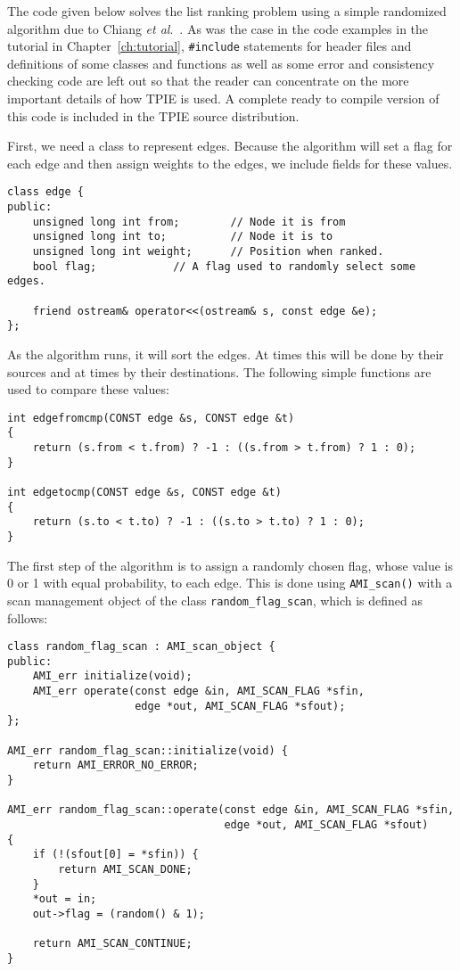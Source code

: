 The code given below solves the list ranking problem using a simple
randomized algorithm due to Chiang {\em et al}.~\cite{chiang:external}.
As was the case in the code examples in the tutorial in
Chapter~\ref{ch:tutorial}, \verb|#include| statements
for header files and definitions of some classes and functions as well
as some error and consistency checking code are left out so that the
reader can concentrate on the more important details of how TPIE is
used.  A complete ready to compile version of this code is included in
the TPIE source distribution.

First, we need a class to represent edges.  Because the algorithm will
set a flag for each edge and then assign weights to the edges, we
include fields for these values.

\begin{verbatim}
class edge {
public:
    unsigned long int from;        // Node it is from
    unsigned long int to;          // Node it is to
    unsigned long int weight;      // Position when ranked.
    bool flag;            // A flag used to randomly select some edges.

    friend ostream& operator<<(ostream& s, const edge &e);
};    
\end{verbatim}

As the algorithm runs, it will sort the edges.  At times this will be
done by their sources and at times by their destinations.  The
following simple functions are used to compare these values:

\begin{verbatim}
int edgefromcmp(CONST edge &s, CONST edge &t)
{
    return (s.from < t.from) ? -1 : ((s.from > t.from) ? 1 : 0);
}
  
int edgetocmp(CONST edge &s, CONST edge &t)
{
    return (s.to < t.to) ? -1 : ((s.to > t.to) ? 1 : 0);
}
\end{verbatim}

The first step of the algorithm is to assign a randomly chosen flag,
whose value is 0 or 1 with equal probability, to each edge.  This is
done using \verb|AMI_scan()| with a scan management object of the
class \verb|random_flag_scan|, which is defined as follows:

\begin{verbatim}
class random_flag_scan : AMI_scan_object {
public:
    AMI_err initialize(void);  
    AMI_err operate(const edge &in, AMI_SCAN_FLAG *sfin,
                    edge *out, AMI_SCAN_FLAG *sfout);
};

AMI_err random_flag_scan::initialize(void) {
    return AMI_ERROR_NO_ERROR;
}

AMI_err random_flag_scan::operate(const edge &in, AMI_SCAN_FLAG *sfin,
                                  edge *out, AMI_SCAN_FLAG *sfout)
{ 
    if (!(sfout[0] = *sfin)) {
        return AMI_SCAN_DONE;
    }
    *out = in;
    out->flag = (random() & 1);
    
    return AMI_SCAN_CONTINUE;
}
\end{verbatim}

